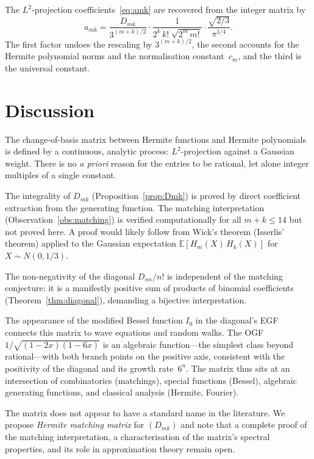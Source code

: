 \documentclass[11pt,a4paper]{article}
\theoremstyle{definition}
\theoremstyle{plain}
\begin{document}
The $L^2$-projection coefficients~\eqref{eq:amk} are recovered from the
integer matrix by
\[
  a_{mk} = \frac{D_{mk}}{3^{(m+k)/2}}
  \cdot \frac{1}{2^k\, k!\; \sqrt{2^m\, m!}}
  \cdot \frac{\sqrt{2/3}}{\pi^{1/4}}.
\]
The first factor undoes the rescaling by $3^{(m+k)/2}$, the second
accounts for the Hermite polynomial norms and the normalisation
constant~$c_m$, and the third is the universal constant.

\section{Discussion}

The change-of-basis matrix between Hermite functions and Hermite
polynomials is defined by a continuous, analytic process: $L^2$-projection
against a Gaussian weight. There is no \emph{a priori} reason for the
entries to be rational, let alone integer multiples of a single
constant.

The integrality of $D_{mk}$ (Proposition~\ref{prop:Dmk}) is proved by
direct coefficient extraction from the generating function. The matching
interpretation (Observation~\ref{obs:matching}) is verified
computationally for all $m + k \le 14$ but not proved here. A proof
would likely follow from Wick's theorem (Isserlis' theorem) applied to
the Gaussian expectation $\mathbb{E}[H_m(X)\,H_k(X)]$ for
$X \sim N(0, 1/3)$.

The non-negativity of the diagonal $D_{nn}/n!$ is independent of the
matching conjecture: it is a manifestly positive sum of products of
binomial coefficients (Theorem~\ref{thm:diagonal}), demanding a
bijective interpretation.

The appearance of the modified Bessel function $I_0$ in the diagonal's
EGF connects this matrix to wave equations and random walks. The OGF
$1/\sqrt{(1-2x)(1-6x)}$ is an algebraic function---the simplest class
beyond rational---with both branch points on the positive axis,
consistent with the positivity of the diagonal and its growth
rate~$6^n$. The matrix thus sits at an intersection of
combinatorics (matchings), special functions (Bessel), algebraic
generating functions, and classical analysis (Hermite, Fourier).

The matrix does not appear to have a standard name in the literature.
We propose \emph{Hermite matching matrix} for $(D_{mk})$ and note that
a complete proof of the matching interpretation, a characterisation of
the matrix's spectral properties, and its role in approximation theory
remain open.
\end{document}
